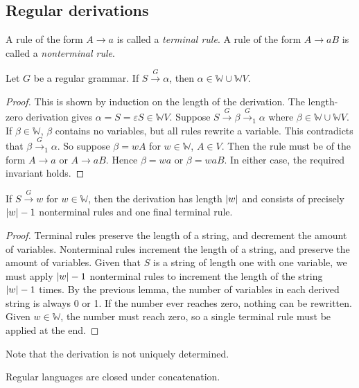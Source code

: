 \subsection{Regular derivations}
\begin{definition}
	A rule of the form \( A \to a \) is called a \emph{terminal rule}.
	A rule of the form \( A \to aB \) is called a \emph{nonterminal rule}.
\end{definition}
\begin{lemma}
	Let \( G \) be a regular grammar.
	If \( S \xrightarrow G \alpha \), then \( \alpha \in \mathbb W \cup \mathbb W V \).
\end{lemma}
\begin{proof}
	This is shown by induction on the length of the derivation.
	The length-zero derivation gives \( \alpha = S = \varepsilon S \in \mathbb W V \).
	Suppose \( S \xrightarrow G \beta \xrightarrow G_1 \alpha \) where \( \beta \in \mathbb W \cup \mathbb W V \).
	If \( \beta \in \mathbb W \), \( \beta \) contains no variables, but all rules rewrite a variable.
	This contradicts that \( \beta \xrightarrow G_1 \alpha \).
	So suppose \( \beta = wA \) for \( w \in \mathbb W \), \( A \in V \).
	Then the rule must be of the form \( A \to a \) or \( A \to aB \).
	Hence \( \beta = wa \) or \( \beta = waB \).
	In either case, the required invariant holds.
\end{proof}
\begin{lemma}
	If \( S \xrightarrow G w \) for \( w \in \mathbb W \), then the derivation has length \( \abs{w} \) and consists of precisely \( \abs{w}-1 \) nonterminal rules and one final terminal rule.
\end{lemma}
\begin{proof}
	Terminal rules preserve the length of a string, and decrement the amount of variables.
	Nonterminal rules increment the length of a string, and preserve the amount of variables.
	Given that \( S \) is a string of length one with one variable, we must apply \( \abs{w}-1 \) nonterminal rules to increment the length of the string \( \abs{w}-1 \) times.
	By the previous lemma, the number of variables in each derived string is always 0 or 1.
	If the number ever reaches zero, nothing can be rewritten.
	Given \( w \in \mathbb W \), the number must reach zero, so a single terminal rule must be applied at the end.
\end{proof}
Note that the derivation is not uniquely determined.
\begin{lemma}
	Regular languages are closed under concatenation.
\end{lemma}
